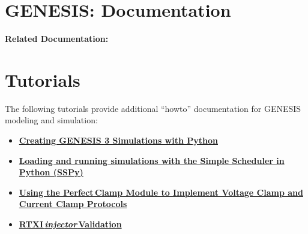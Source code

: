 \documentclass[12pt]{article}
\begin{document}
\section*{GENESIS: Documentation}

{\bf Related Documentation:}

\section*{Tutorials}

The following tutorials provide additional ``howto'' documentation for GENESIS modeling and simulation:
\begin{itemize}
   \item[]\href{../tutorial-python-scripting/tutorial-python-scripting.html}
          {\bf Creating GENESIS 3 Simulations with Python}
   \item[]\href{../sspy/sspy.tex}{\bf Loading and running simulations with the
 Simple Scheduler in Python (SSPy)}

   \item[]\href{../pclamp/pclamp.tex}{\bf Using the Perfect\,Clamp Module to Implement Voltage Clamp and Current Clamp Protocols}
   \item[]\href{../rtxi-injector-validation/rtxi-injector-validation.tex}{\bf RTXI\,{\it injector}\,Validation}
\end{itemize}
\end{document}
